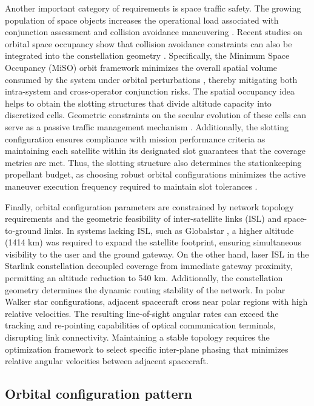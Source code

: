 Another important category of requirements is space traffic safety. The growing population of space objects increases the operational load associated with conjunction assessment and collision avoidance maneuvering \cite{esa2025environment}. Recent studies on orbital space occupancy show that collision avoidance constraints can also be integrated into the constellation geometry \cite{arnas2023capacity, zhang2026}. Specifically, the Minimum Space Occupancy (MiSO) orbit framework minimizes the overall spatial volume consumed by the system under orbital perturbations \cite{reiland2021}, thereby mitigating both intra-system and cross-operator conjunction risks. The spatial occupancy idea helps to obtain the slotting structures that divide altitude capacity into discretized cells. Geometric constraints on the secular evolution of these cells can serve as a passive traffic management mechanism \cite{arnas2021definition}. Additionally, the slotting configuration ensures compliance with mission performance criteria as maintaining each satellite within its designated slot guarantees that the coverage metrics are met.  Thus, the slotting structure also determines the stationkeeping propellant budget, as choosing robust orbital configurations minimizes the active maneuver execution frequency required to maintain slot tolerances \cite{maisonobe2023, wertz1998}.

Finally, orbital configuration parameters are constrained by network topology requirements and the geometric feasibility of inter-satellite links (ISL) and space-to-ground links. In systems lacking ISL, such as Globalstar \cite{wiedeman1993globalstar}, a higher altitude (1414 km) was required to expand the satellite footprint, ensuring simultaneous visibility to the user and the ground gateway. On the other hand, laser ISL in the Starlink constellation \cite{ali2026starlink} decoupled coverage from immediate gateway proximity, permitting an altitude reduction to 540 km. Additionally, the constellation geometry determines the dynamic routing stability of the network. In polar Walker star configurations, adjacent spacecraft cross near polar regions with high relative velocities. The resulting line-of-sight angular rates can exceed the tracking and re-pointing capabilities of optical communication terminals, disrupting link connectivity. Maintaining a stable topology requires the optimization framework to select specific inter-plane phasing that minimizes relative angular velocities between adjacent spacecraft.

\subsection{Orbital configuration pattern}

